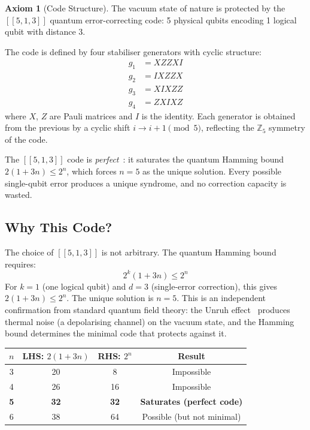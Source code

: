 \documentclass[11pt,a4paper]{article}
\theoremstyle{definition}
\newtheorem{axiom}{Axiom}
\begin{document}
\begin{axiom}[Code Structure]
\label{axiom:code}
The vacuum state of nature is protected by the $[[5,1,3]]$ quantum error-correcting code: 5 physical qubits encoding 1 logical qubit with distance 3.
\end{axiom}

The code is defined by four stabiliser generators with cyclic structure:
\begin{align}
g_1 &= X Z Z X I \\ 
g_2 &= I X Z Z X \\
g_3 &= X I X Z Z \\
g_4 &= Z X I X Z
\label{eq:stabilisers}
\end{align}
where $X$, $Z$ are Pauli matrices and $I$ is the identity. Each generator is obtained from the previous by a cyclic shift $i \to i+1 \pmod{5}$, reflecting the $\mathbb{Z}_5$ symmetry of the code.

The $[[5,1,3]]$ code is \emph{perfect}~\cite{Laflamme1996}: it saturates the quantum Hamming bound $2(1 + 3n) \leq 2^n$, which forces $n = 5$ as the unique solution. Every possible single-qubit error produces a unique syndrome, and no correction capacity is wasted.

\subsection{Why This Code?}

The choice of $[[5,1,3]]$ is not arbitrary. The quantum Hamming bound requires:
\begin{equation}
2^k(1 + 3n) \leq 2^n
\label{eq:hamming}
\end{equation}
For $k = 1$ (one logical qubit) and $d = 3$ (single-error correction), this gives $2(1 + 3n) \leq 2^n$. The unique solution is $n = 5$. This is an independent confirmation from standard quantum field theory: the Unruh effect~\cite{Unruh1976}  produces thermal noise (a depolarising channel) on the vacuum state, and the Hamming bound determines the minimal code that protects against it.

\begin{center}
\begin{tabular}{cccc}
\toprule
$n$ & LHS: $2(1+3n)$ & RHS: $2^n$ & Result \\
\midrule
3 & 20 & 8 & Impossible \\
4 & 26 & 16 & Impossible \\
\textbf{5} & \textbf{32} & \textbf{32} & \textbf{Saturates (perfect code)} \\
6 & 38 & 64 & Possible (but not minimal) \\
\bottomrule
\end{tabular}
\end{center}
\end{document}
